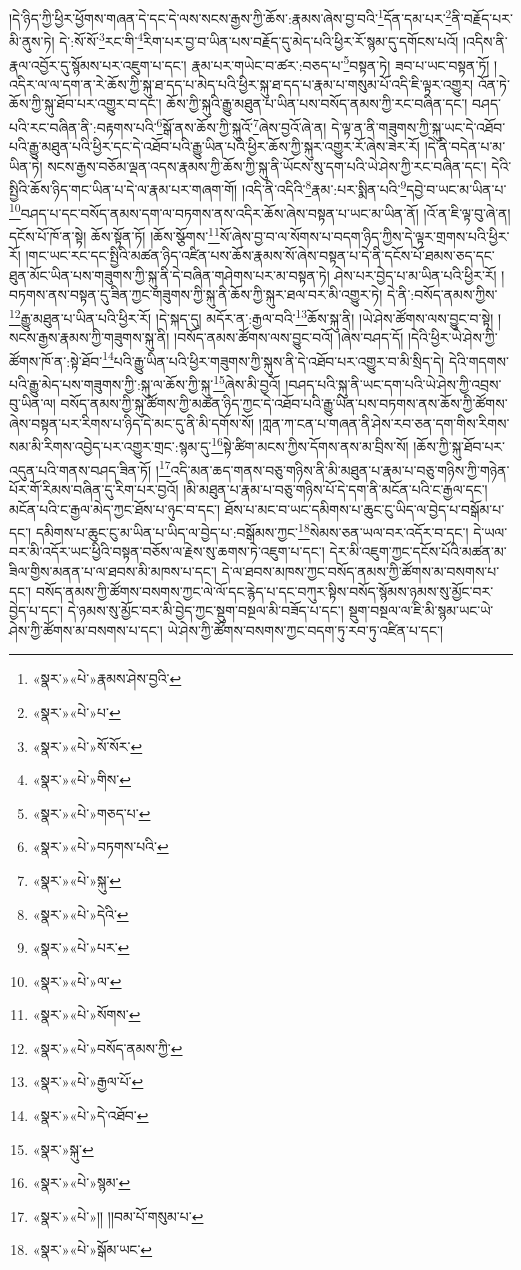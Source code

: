 །དེ་ཉིད་ཀྱི་ཕྱིར་ཕྱོགས་གཞན་དེ་དང་དེ་ལས་སངས་རྒྱས་ཀྱི་ཆོས་:རྣམས་ཞེས་བྱ་བའི་\footnote{«སྣར་»«པེ་»རྣམས་ཤེས་བྱའི་}དོན་དམ་པར་\footnote{«སྣར་»«པེ་»པ་}ནི་བརྗོད་པར་མི་ནུས་ཏེ། དེ་:སོ་སོ་\footnote{«སྣར་»«པེ་»སོ་སོར་}རང་གི་\footnote{«སྣར་»«པེ་»གིས་}རིག་པར་བྱ་བ་ཡིན་པས་བརྗོད་དུ་མེད་པའི་ཕྱིར་རོ་སྙམ་དུ་དགོངས་པའོ། །འདིས་ནི་རྣལ་འབྱོར་དུ་སྙོམས་པར་འཇུག་པ་དང་། རྣམ་པར་གཡེང་བ་ཚར་:བཅད་པ་\footnote{«སྣར་»«པེ་»གཅད་པ་}བསྟན་ཏེ། ཟབ་པ་ཡང་བསྟན་ཏོ། །འདིར་ལ་ལ་དག་ན་རེ་ཆོས་ཀྱི་སྐུ་ཐ་དད་པ་མེད་པའི་ཕྱིར་སྐུ་ཐ་དད་པ་རྣམ་པ་གསུམ་པོ་འདི་ཇི་ལྟར་འགྱུར། འོན་ཏེ་ཆོས་ཀྱི་སྐུ་ཐོབ་པར་འགྱུར་བ་དང་། ཆོས་ཀྱི་སྐུའི་རྒྱུ་མཐུན་པ་ཡིན་པས་བསོད་ནམས་ཀྱི་རང་བཞིན་དང་། བཤད་པའི་རང་བཞིན་ནི་:བརྟགས་པའི་\footnote{«སྣར་»«པེ་»བཏགས་པའི་}སྒོ་ནས་ཆོས་ཀྱི་སྐུའོ་\footnote{«སྣར་»«པེ་»སྐུ་}ཞེས་བྱའོ་ཞེ་ན། དེ་ལྟ་ན་ནི་གཟུགས་ཀྱི་སྐུ་ཡང་དེ་འཐོབ་པའི་རྒྱུ་མཐུན་པའི་ཕྱིར་དང་དེ་འཐོབ་པའི་རྒྱུ་ཡིན་པའི་ཕྱིར་ཆོས་ཀྱི་སྐུར་འགྱུར་རོ་ཞེས་ཟེར་རོ། །དེ་ནི་བདེན་པ་མ་ཡིན་ཏེ། སངས་རྒྱས་བཅོམ་ལྡན་འདས་རྣམས་ཀྱི་ཆོས་ཀྱི་སྐུ་ནི་ཡོངས་སུ་དག་པའི་ཡེ་ཤེས་ཀྱི་རང་བཞིན་དང་། དེའི་སྤྱིའི་ཆོས་ཉིད་གང་ཡིན་པ་དེ་ལ་རྣམ་པར་གཞག་གོ། །འདི་ནི་འདིའི་\footnote{«སྣར་»«པེ་»དེའི་}རྣམ་:པར་སྨིན་པའི་\footnote{«སྣར་»«པེ་»པར་}དབྱེ་བ་ཡང་མ་ཡིན་པ་\footnote{«སྣར་»«པེ་»ལ་}བཤད་པ་དང་བསོད་ནམས་དག་ལ་བཏགས་ནས་འདིར་ཆོས་ཞེས་བསྟན་པ་ཡང་མ་ཡིན་ནོ། །འོ་ན་ཇི་ལྟ་བུ་ཞེ་ན། དངོས་པོ་ཁོ་ན་སྟེ། ཆོས་སྟོན་ཏོ། །ཆོས་སྩོགས་\footnote{«སྣར་»«པེ་»སོགས་}སོ་ཞེས་བྱ་བ་ལ་སོགས་པ་བདག་ཉིད་ཀྱིས་དེ་ལྟར་གྲགས་པའི་ཕྱིར་རོ། །གང་ཡང་རང་དང་སྤྱིའི་མཚན་ཉིད་འཛིན་པས་ཆོས་རྣམས་སོ་ཞེས་བསྟན་པ་དེ་ནི་དངོས་པོ་ཐམས་ཅད་དང་ཐུན་མོང་ཡིན་པས་གཟུགས་ཀྱི་སྐུ་ནི་དེ་བཞིན་གཤེགས་པར་མ་བསྟན་ཏེ། ཤེས་པར་བྱེད་པ་མ་ཡིན་པའི་ཕྱིར་རོ། །བཏགས་ནས་བསྟན་དུ་ཟིན་ཀྱང་གཟུགས་ཀྱི་སྐུ་ནི་ཆོས་ཀྱི་སྐུར་ཐལ་བར་མི་འགྱུར་ཏེ། དེ་ནི་:བསོད་ནམས་ཀྱིས་\footnote{«སྣར་»«པེ་»བསོད་ནམས་ཀྱི་}རྒྱུ་མཐུན་པ་ཡིན་པའི་ཕྱིར་རོ། །དེ་སྐད་དུ། མདོར་ན་:རྒྱལ་བའི་\footnote{«སྣར་»«པེ་»རྒྱལ་པོ་}ཆོས་སྐུ་ནི། །ཡེ་ཤེས་ཚོགས་ལས་བྱུང་བ་སྟེ། །སངས་རྒྱས་རྣམས་ཀྱི་གཟུགས་སྐུ་ནི། །བསོད་ནམས་ཚོགས་ལས་བྱུང་བའོ། །ཞེས་བཤད་དོ། །དེའི་ཕྱིར་ཡེ་ཤེས་ཀྱི་ཚོགས་ཁོ་ན་:སྟེ་ཐོབ་\footnote{«སྣར་»«པེ་»དེ་འཐོབ་}པའི་རྒྱུ་ཡིན་པའི་ཕྱིར་གཟུགས་ཀྱི་སྐུས་ནི་དེ་འཐོབ་པར་འགྱུར་བ་མི་སྲིད་དེ། དེའི་གདགས་པའི་རྒྱུ་མེད་པས་གཟུགས་ཀྱི་:སྐུ་ལ་ཆོས་ཀྱི་སྐུ་\footnote{«སྣར་»སྐུ་}ཞེས་མི་བྱའོ། །བཤད་པའི་སྐུ་ནི་ཡང་དག་པའི་ཡེ་ཤེས་ཀྱི་འབྲས་བུ་ཡིན་ལ། བསོད་ནམས་ཀྱི་སྐུ་ཚོགས་ཀྱི་མཚན་ཉིད་ཀྱང་དེ་འཐོབ་པའི་རྒྱུ་ཡིན་པས་བཏགས་ནས་ཆོས་ཀྱི་ཚོགས་ཞེས་བསྟན་པར་རིགས་པ་ཉིད་དེ་མང་དུ་ནི་མི་དགོས་སོ། །ཀླན་ཀ་ངན་པ་གཞན་ནི་ཤེས་རབ་ཅན་དག་གིས་རིགས་སམ་མི་རིགས་འབྱེད་པར་འགྱུར་གྲང་:སྙམ་དུ་\footnote{«སྣར་»«པེ་»སྙམ་}སྟེ་ཚིག་མངས་ཀྱིས་དོགས་ནས་མ་བྲིས་སོ། །ཆོས་ཀྱི་སྐུ་ཐོབ་པར་འདུན་པའི་གནས་བཤད་ཟིན་ཏོ། །\footnote{«སྣར་»«པེ་»།། །།བམ་པོ་གསུམ་པ་}འདི་མན་ཆད་གནས་བཅུ་གཉིས་ནི་མི་མཐུན་པ་རྣམ་པ་བཅུ་གཉིས་ཀྱི་གཉེན་པོར་གོ་རིམས་བཞིན་དུ་རིག་པར་བྱའོ། །མི་མཐུན་པ་རྣམ་པ་བཅུ་གཉིས་པོ་དེ་དག་ནི་མངོན་པའི་ང་རྒྱལ་དང་། མངོན་པའི་ང་རྒྱལ་མེད་ཀྱང་ཐོས་པ་ཉུང་བ་དང་། ཐོས་པ་མང་བ་ཡང་དམིགས་པ་ཆུང་ངུ་ཡིད་ལ་བྱེད་པ་བསྒོམ་པ་དང་། དམིགས་པ་ཆུང་ངུ་མ་ཡིན་པ་ཡིད་ལ་བྱེད་པ་:བསྒོམས་ཀྱང་\footnote{«སྣར་»«པེ་»སྒོམ་ཡང་}སེམས་ཅན་ཡལ་བར་འདོར་བ་དང་། དེ་ཡལ་བར་མི་འདོར་ཡང་ཕྱིའི་བསྟན་བཅོས་ལ་རྗེས་སུ་ཆགས་ཏེ་འཇུག་པ་དང་། དེར་མི་འཇུག་ཀྱང་དངོས་པོའི་མཚན་མ་ཟིལ་གྱིས་མནན་པ་ལ་ཐབས་མི་མཁས་པ་དང་། དེ་ལ་ཐབས་མཁས་ཀྱང་བསོད་ནམས་ཀྱི་ཚོགས་མ་བསགས་པ་དང་། བསོད་ནམས་ཀྱི་ཚོགས་བསགས་ཀྱང་ལེ་ལོ་དང་རྙེད་པ་དང་བཀུར་སྟིས་བསོད་སྙོམས་ཉམས་སུ་མྱོང་བར་བྱེད་པ་དང་། དེ་ཉམས་སུ་མྱོང་བར་མི་བྱེད་ཀྱང་སྡུག་བསྔལ་མི་བཟོད་པ་དང་། སྡུག་བསྔལ་ལ་ཇི་མི་སྙམ་ཡང་ཡེ་ཤེས་ཀྱི་ཚོགས་མ་བསགས་པ་དང་། ཡེ་ཤེས་ཀྱི་ཚོགས་བསགས་ཀྱང་བདག་ཏུ་རབ་ཏུ་འཛིན་པ་དང་། 